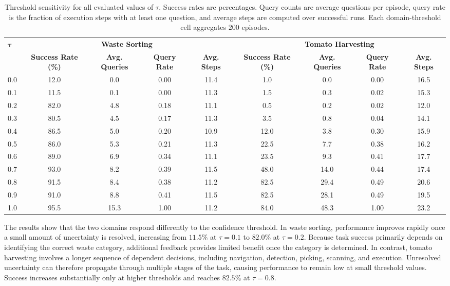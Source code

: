 \begin{table}[t]
\centering
\caption{Threshold sensitivity for all evaluated values of $\tau$. Success rates are percentages. Query counts are average questions per episode, query rate is the fraction of execution steps with at least one question, and average steps are computed over successful runs. Each domain-threshold cell aggregates $200$ episodes.}
\label{tab:sys_tau}
\footnotesize
\setlength{\tabcolsep}{2pt}
\begin{tabular*}{\textwidth}{@{\extracolsep{\fill}}lcccccccc}
\toprule
\multirow{2}{*}{$\boldsymbol{\tau}$} & \multicolumn{4}{c}{\textbf{Waste Sorting}} & \multicolumn{4}{c}{\textbf{Tomato Harvesting}} \\
\cmidrule(lr){2-5}\cmidrule(lr){6-9}
& \textbf{Success Rate (\%)} & \textbf{Avg. Queries} & \textbf{Query Rate} & \textbf{Avg. Steps} & \textbf{Success Rate (\%)} & \textbf{Avg. Queries} & \textbf{Query Rate} & \textbf{Avg. Steps} \\
\midrule
0.0 & 12.0 & 0.0 & 0.00 & 11.4 & 1.0 & 0.0 & 0.00 & 16.5 \\
0.1 & 11.5 & 0.1 & 0.00 & 11.3 & 1.5 & 0.3 & 0.02 & 15.3 \\
0.2 & 82.0 & 4.8 & 0.18 & 11.1 & 0.5 & 0.2 & 0.02 & 12.0 \\
0.3 & 80.5 & 4.5 & 0.17 & 11.3 & 3.5 & 0.8 & 0.04 & 14.1 \\
0.4 & 86.5 & 5.0 & 0.20 & 10.9 & 12.0 & 3.8 & 0.30 & 15.9 \\
0.5 & 86.0 & 5.3 & 0.21 & 11.3 & 22.5 & 7.7 & 0.38 & 16.2 \\
0.6 & 89.0 & 6.9 & 0.34 & 11.1 & 23.5 & 9.3 & 0.41 & 17.7 \\
0.7 & 93.0 & 8.2 & 0.39 & 11.5 & 48.0 & 14.0 & 0.44 & 17.4 \\
0.8 & 91.5 & 8.4 & 0.38 & 11.2 & 82.5 & 29.4 & 0.49 & 20.6 \\
0.9 & 91.0 & 8.8 & 0.41 & 11.5 & 82.5 & 28.1 & 0.49 & 19.5 \\
1.0 & 95.5 & 15.3 & 1.00 & 11.2 & 84.0 & 48.3 & 1.00 & 23.2 \\
\bottomrule
\end{tabular*}
\end{table}

The results show that the two domains respond differently to the confidence threshold. In waste sorting, performance improves rapidly once a small amount of uncertainty is resolved, increasing from $11.5\%$ at $\tau=0.1$ to $82.0\%$ at $\tau=0.2$. Because task success primarily depends on identifying the correct waste category, additional feedback provides limited benefit once the category is determined. In contrast, tomato harvesting involves a longer sequence of dependent decisions, including navigation, detection, picking, scanning, and execution. Unresolved uncertainty can therefore propagate through multiple stages of the task, causing performance to remain low at small threshold values. Success increases substantially only at higher thresholds and reaches $82.5\%$ at $\tau=0.8$.

